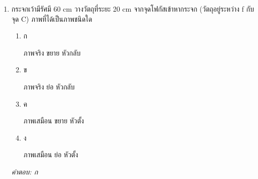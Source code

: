 \documentclass[12pt]{article}
\begin{document}
\begin{enumerate}[label=\arabic*., itemsep=0.5\baselineskip, topsep=0.5\baselineskip, leftmargin=*]
\item กระจกเว้ามีรัศมี 60 cm วางวัตถุที่ระยะ 20 cm จากจุดโฟกัสเข้าหากระจก (วัตถุอยู่ระหว่าง f กับจุด C) ภาพที่ได้เป็นภาพชนิดใด
\begin{enumerate}[label=\alph*)., itemsep=0.3\baselineskip, topsep=0.3\baselineskip]
\item ก\ 
\begin{minipage}[t]{0.9\linewidth}
\raggedright ภาพจริง ขยาย หัวกลับ
\end{minipage}
\item ข\ 
\begin{minipage}[t]{0.9\linewidth}
\raggedright ภาพจริง ย่อ หัวกลับ
\end{minipage}
\item ค\ 
\begin{minipage}[t]{0.9\linewidth}
\raggedright ภาพเสมือน ขยาย หัวตั้ง
\end{minipage}
\item ง\ 
\begin{minipage}[t]{0.9\linewidth}
\raggedright ภาพเสมือน ย่อ หัวตั้ง
\end{minipage}
\end{enumerate}
\vspace{-0.3\baselineskip}
\begin{small}
\textit{คำตอบ: ก}
\end{small}

\end{enumerate}
\end{document}
